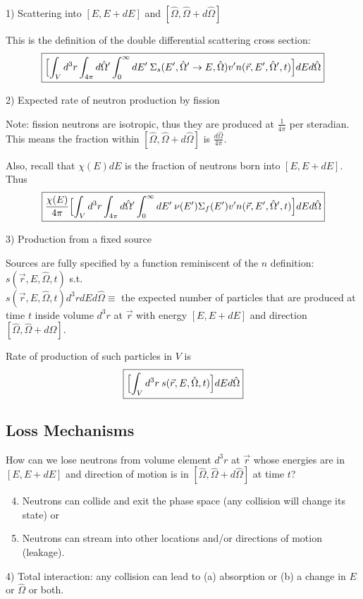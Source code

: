\documentclass[12pt]{article}
\newcommand{\vOmega}{\ensuremath{\hat{\Omega}}}
\begin{document}
1) Scattering into $[E, E + dE]$ and $[\vOmega, \vOmega + d\vOmega]$

This is the definition of the double differential scattering cross section:
\[\boxed{\Bigl[\int_V d^3r \int_{4\pi} d\vOmega' \int_0^{\infty} dE' \: \Sigma_s(E', \vOmega' \rightarrow E, \vOmega) v' n(\vec{r}, E', \vOmega', t) \Bigr] dE d\vOmega}\]

2) Expected rate of neutron production by fission

Note: fission neutrons are isotropic, thus they are produced at $\frac{1}{4\pi}$ per steradian. This means the fraction within $[\vOmega, \vOmega + d\vOmega]$ is $\frac{d\vOmega}{4\pi}$.

Also, recall that $\chi(E)dE$ is the fraction of neutrons born into $[E, E + dE]$. Thus
%
\[\boxed{\frac{\chi(E)}{4\pi}\Bigl[\int_V d^3r \int_{4\pi} d\vOmega' \int_0^{\infty} dE' \: \nu(E') \Sigma_f(E') v' n(\vec{r}, E', \vOmega', t) \Bigr] dE d\vOmega}\]

3) Production from a fixed source

Sources are fully specified by a function reminiscent of the $n$ definition: $s(\vec{r}, E, \vOmega, t)$ s.t.\ \\$s(\vec{r}, E, \vOmega, t)d^3rdEd\vOmega \equiv$ the expected number of particles that are produced at time $t$ inside volume $d^3r$ at $\vec{r}$ with energy $[E, E + dE]$ and direction $[\vOmega, \vOmega + d\vOmega]$.

Rate of production of such particles in $V$ is
\[\boxed{\Bigl[\int_V d^3r \:s(\vec{r}, E, \vOmega, t) \Bigr] dE d\vOmega }\]

\subsection*{Loss Mechanisms}
How can we lose neutrons from volume element $d^3r$ at $\vec{r}$ whose energies are in $[E, E + dE]$ and direction of motion is in $[\vOmega, \vOmega + d\vOmega]$ at time $t$?
%
\begin{enumerate}
\setcounter{enumi}{3}
\item Neutrons can collide and exit the phase space (any collision will change its state) or
\item Neutrons can stream into other locations and/or directions of motion (leakage).
\end{enumerate}

4) Total interaction: any collision can lead to (a) absorption or (b) a change in $E$ or $\vOmega$ or both.
\end{document}
